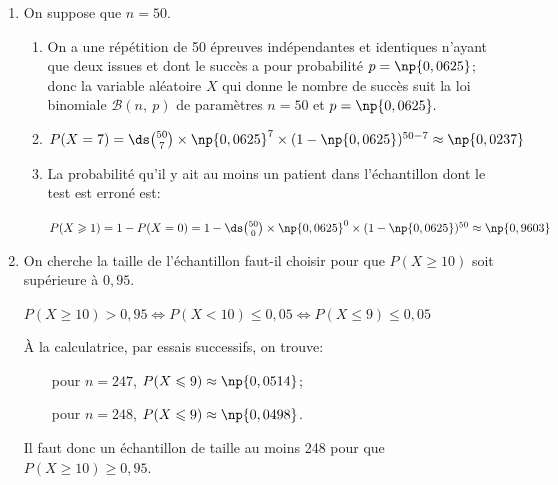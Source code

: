 
\begin{enumerate}
\item On suppose que $n = 50$.
	\begin{enumerate}
		\item %
On a une répétition de 50 épreuves indépendantes et identiques n'ayant que deux issues et dont le succès a pour probabilité $p=\np{0,0625}$; donc la variable aléatoire $X$ qui donne le nombre de succès suit la loi binomiale $\mathcal{B}(n,\: p)$ de paramètres $n = 50$ et $p = \np{0,0625}.$
		
		\item $P(X = 7) = \ds\binom{50}{7}\times \np{0,0625}^{7}\times (1-\np{0,0625})^{50-7}\approx \np{0,0237}$
		
		\item La probabilité qu'il y ait au moins un patient dans l'échantillon dont le test est erroné est:
		
$P(X\geqslant 1) = 1-P(X=0) = 1- \ds\binom{50}{0}\times \np{0,0625}^0\times (1-\np{0,0625})^{50}\approx \np{0,9603}$		
		
	\end{enumerate}	
\item On cherche la taille de l'échantillon faut-il choisir pour que $P(X \geqslant 10)$ soit supérieure à $0,95$.

$P(X \geqslant 10)>0,95 \iff P(X < 10) \leqslant 0,05 \iff P(X \leqslant 9) \leqslant 0,05$

À la calculatrice, par essais successifs, on trouve:

~~\textbullet~~pour $n=247$, $P(X\leqslant 9) \approx \np{0,0514}$;

~~\textbullet~~pour $n=248$, $P(X\leqslant 9) \approx \np{0,0498}$.

Il faut donc un échantillon de taille au moins 248 pour que $P(X\geqslant 10)\geqslant 0,95$.

\end{enumerate}

\bigskip

